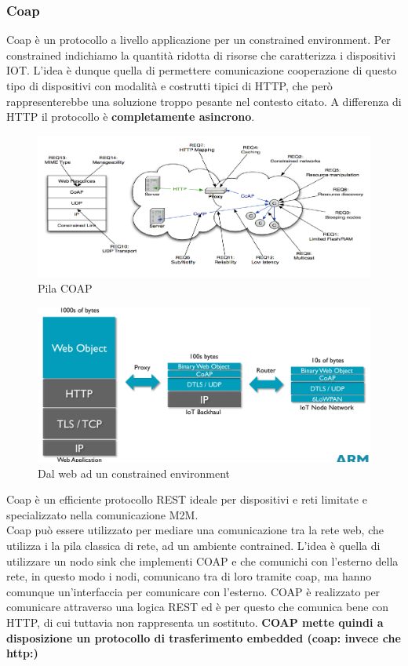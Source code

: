 \documentclass[12pt]{article}
\begin{document}
    	\subsubsection{Coap}
    	Coap è un protocollo a livello applicazione per un constrained environment. Per constrained indichiamo la quantità ridotta di risorse che caratterizza i dispositivi IOT. L'idea è dunque quella di permettere comunicazione cooperazione di questo tipo di dispositivi con modalità e costrutti tipici di HTTP, che però rappresenterebbe una soluzione troppo pesante nel contesto citato. A differenza di HTTP il protocollo è \textbf{completamente asincrono}.
    	\begin{figure}[h!]
    		\centering
    		\includegraphics[scale=0.4]{img/coap.png}
    		\caption{Pila COAP	}
    	\end{figure}
    	\begin{figure}[h!]
    		\centering
    		\includegraphics[scale=0.4]{img/coapstack.png}
    		\caption{Dal web ad un constrained environment	}
    	\end{figure}
    	Coap è un efficiente protocollo REST ideale per dispositivi e reti limitate e specializzato nella comunicazione M2M. \\
    	Coap può essere utilizzato per mediare una comunicazione tra la rete web, che utilizza i la pila classica di rete, ad un ambiente contrained. L'idea è quella di utilizzare un nodo sink che implementi COAP e che comunichi con l'esterno della rete, in questo modo i nodi, comunicano tra di loro tramite coap, ma hanno comunque un'interfaccia per comunicare con l'esterno. COAP è realizzato per comunicare attraverso una logica REST ed è per questo che comunica bene con HTTP, di cui tuttavia non rappresenta un sostituto. \textbf{COAP mette quindi a disposizione un protocollo di trasferimento embedded (coap: invece che http:)}
			
\end{document}
